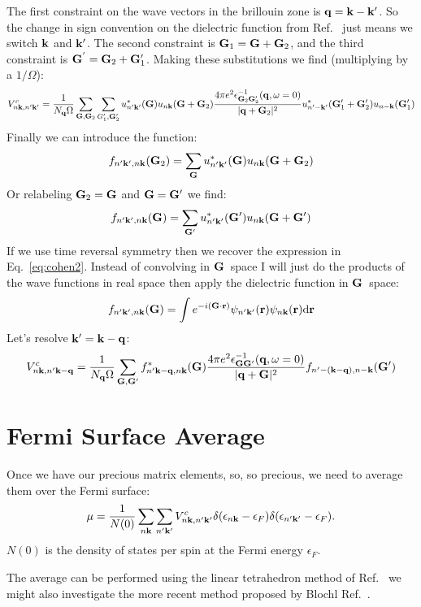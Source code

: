 \documentclass{article}
\def\r{{\bf r}}
\def\k{{\bf k}}
\def\q{{\bf q}}
\def\G{{\bf G}}
\begin{document}
The first constraint on the wave vectors in the brillouin zone is $\q=\k-\k'$. So the change in sign convention
on the dielectric function from Ref.~\cite{cohen95} just means we switch $\k$ and $\k'$. The second
constraint is $\G_{1} = \G + \G_{2}$, and the third constraint is $\G^{'}=\G_{2}+\G_{1}'$. Making
these substitutions we find (multiplying by a $1/\Omega$): 
%
\begin{equation}
V^{c}_{n\k,n'\k'} = \frac{1}{N_{\q}\Omega}\sum_{\G,\G_{2}}\sum_{G_{1}',\G_{2}'} u^{*}_{n'\k'}(\G)u_{n\k}(\G+\G_{2})
\frac{4\pi e^{2}\epsilon^{-1}_{\G_{2}\G_{2}'}(\q,\omega=0)}{|\q+\G_{2}|^{2}}u^{*}_{n'-\k'}(\G_{1}'+\G_{2}')u_{n-\k}(\G_{1}')
\end{equation}
%
Finally we can introduce the function:
%
\begin{equation}
f_{n'\k',n\k}(\G_{2})= \sum_{\G} u^{*}_{n'\k'}(\G)u_{n\k}(\G+\G_{2})
\end{equation}
%
Or relabeling $\G_{2}=\G$ and $\G=\G'$ we find:
%
\begin{equation}
f_{n'\k',n\k}(\G)= \sum_{\G'} u^{*}_{n'\k'}(\G')u_{n\k}(\G+\G')
\end{equation}
%
If we use time reversal symmetry then we 
recover the expression in Eq.~\ref{eq:cohen2}.
Instead of convolving in $\G$~space I will just do the products of the
wave functions in real space then apply the dielectric function in $\G$~space:
%
\begin{equation}
f_{n'\k',n\k}(\G) = \int e^{-i(\G\cdot\r)} \psi_{n'\k'}(\r)\psi_{n\k}(\r) \rm{d}\r
\end{equation}
%
Let's resolve $\k'=\k-\q$:
%
\begin{equation}
V^{c}_{n\k,n'\k-\q} = \frac{1}{N_{\q}\Omega}\sum_{\G,\G'}f^{*}_{n'\k-\q,n\k}(\G)
\frac{4\pi e^{2}\epsilon^{-1}_{\G\G'}(\q,\omega=0)}{|\q+\G|^{2}}f_{n'-(\k-\q),n-\k}(\G')
\end{equation}
%
\section{Fermi Surface Average}
Once we have our precious matrix elements, so, 
so precious, we need to average them over the Fermi surface:
%
\begin{equation}
\mu = \frac{1}{N(0)} \sum_{n\k}\sum_{n'\k'}V^{c}_{n\k,n'\k'}\delta(\epsilon_{n\k}-\epsilon_{F})\delta(\epsilon_{n'\k'}-\epsilon_{F}).
\end{equation}
%
$N(0)$ is the density of states per spin at the Fermi energy $\epsilon_{F}$.

The average can be performed using the linear tetrahedron method of Ref.~\cite{lehmann72} we might
also investigate the more recent method proposed by Blochl Ref.~\cite{blochl94}.
\end{document}

